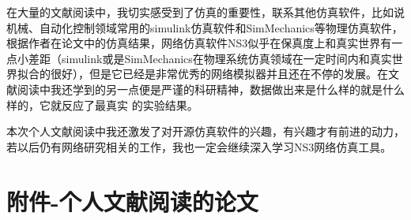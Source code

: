 \documentclass[lang=cn,11pt,a4paper,cite=authoryear]{elegantpaper}
\begin{document}
在大量的文献阅读中，我切实感受到了仿真的重要性，联系其他仿真软件，比如说机械、自动化控制领域常用的simulink仿真软件和SimMechanics等物理仿真软件，根据作者在论文中的仿真结果，网络仿真软件NS3似乎在保真度上和真实世界有一点小差距（simulink或是SimMechanics在物理系统仿真领域在一定时间内和真实世界拟合的很好），但是它已经是非常优秀的网络模拟器并且还在不停的发展。在文献阅读中我还学到的另一点便是严谨的科研精神，数据做出来是什么样的就是什么样的，它就反应了最真实 的实验结果。

本次个人文献阅读中我还激发了对开源仿真软件的兴趣，有兴趣才有前进的动力，若以后仍有网络研究相关的工作，我也一定会继续深入学习NS3网络仿真工具。

\section{附件-个人文献阅读的论文}
\end{document}
